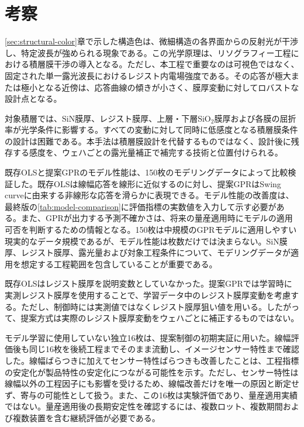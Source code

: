 \documentclass[11pt,a4paper]{ltjsarticle}
\begin{document}
\section{考察}
\label{sec:discussion}

\ref{sec:structural-color}章で示した構造色は、微細構造の各界面からの反射光が干渉し、特定波長が強められる現象である。この光学原理は、リソグラフィー工程における積層膜干渉の導入となる。ただし、本工程で重要なのは可視色ではなく、固定された単一露光波長におけるレジスト内電場強度である。その応答が極大または極小となる近傍は、応答曲線の傾きが小さく、膜厚変動に対してロバストな設計点となる。

対象積層では、SiN膜厚、レジスト膜厚、上層・下層SiO$_2$膜厚および各膜の屈折率が光学条件に影響する。すべての変動に対して同時に低感度となる積層膜条件の設計は困難である。本手法は積層膜設計を代替するものではなく、設計後に残存する感度を、ウェハごとの露光量補正で補完する技術と位置付けられる。

既存OLSと提案GPRのモデル性能は、150枚のモデリングデータによって比較検証した。既存OLSは線幅応答を線形に近似するのに対し、提案GPRはSwing curveに由来する非線形な応答を滑らかに表現できる。モデル性能の改善度は、最終版の\cref{tab:model-comparison}に評価指標の実数値を入力して示す必要がある。また、GPRが出力する予測不確かさは、将来の量産適用時にモデルの適用可否を判断するための情報となる。150枚は中規模のGPRモデルに適用しやすい現実的なデータ規模であるが、モデル性能は枚数だけでは決まらない。SiN膜厚、レジスト膜厚、露光量および対象工程条件について、モデリングデータが適用を想定する工程範囲を包含していることが重要である。

既存OLSはレジスト膜厚を説明変数としていなかった。提案GPRでは学習時に実測レジスト膜厚を使用することで、学習データ中のレジスト膜厚変動を考慮する。ただし、制御時には実測値ではなくレジスト膜厚狙い値を用いる。したがって、提案方式は実際のレジスト膜厚変動をウェハごとに補正するものではない。

モデル学習に使用していない独立16枚は、提案制御の初期実証に用いた。線幅評価後も同じ16枚を後続工程までそのまま流動し、イメージセンサー特性まで確認した。線幅ばらつきに加えてセンサー特性ばらつきも改善したことは、工程指標の安定化が製品特性の安定化につながる可能性を示す。ただし、センサー特性は線幅以外の工程因子にも影響を受けるため、線幅改善だけを唯一の原因と断定せず、寄与の可能性として扱う。また、この16枚は実験評価であり、量産適用実績ではない。量産適用後の長期安定性を確認するには、複数ロット、複数期間および複数装置を含む継続評価が必要である。
\end{document}
